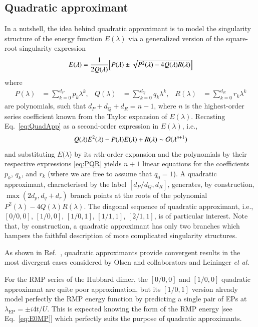 \documentclass[aps,prb,reprint,noshowkeys,linenumbers,superscriptaddress]{revtex4-1}
\newcommand{\latin}[1]{#1}
\newcommand{\ie}{\latin{i.e.}}
\newcommand{\etal}{\textit{et al.}}
\begin{document}
\subsection{Quadratic approximant}
In a nutshell, the idea behind quadratic approximant is to model the singularity structure of the energy function $E(\lambda)$ via a generalized version of the square-root singularity expression \cite{Mayer_1985,Goodson_2011,Goodson_2019}
\begin{equation}
	\label{eq:QuadApp}
	E(\lambda) = \frac{1}{2 Q(\lambda)} \qty[ P(\lambda) \pm \sqrt{P^2(\lambda) - 4 Q(\lambda) R(\lambda)} ]
\end{equation}
where 
\begin{align}
	\label{eq:PQR}
	P(\lambda) & = \sum_{k=0}^{d_P} p_k \lambda^k,
	&
	Q(\lambda) & = \sum_{k=0}^{d_Q} q_k \lambda^k, 
	&
	R(\lambda) & = \sum_{k=0}^{d_R} r_k \lambda^k 
\end{align}
are polynomials, such that $d_P + d_Q + d_R = n - 1$, where $n$ is the highest-order series coefficient known from the Taylor expansion of $E(\lambda)$.
Recasting Eq.~\eqref{eq:QuadApp} as a second-order expression in $E(\lambda)$, \ie,
\begin{equation}
	Q(\lambda) E^2(\lambda) - P(\lambda) E(\lambda) + R(\lambda) \sim \order*{\lambda^{n+1}}
\end{equation}
and substituting $E(\lambda$) by its $n$th-order expansion and the polynomials by their respective expressions \eqref{eq:PQR} yields $n+1$ linear equations for the coefficients $p_k$, $q_k$, and $r_k$ (where we are free to assume that $q_0 = 1$).
A quadratic approximant, characterised by the label $[d_P/d_Q,d_R]$, generates, by construction, $\max(2d_p,d_q+d_r)$ branch points at the roots of the polynomial $P^2(\lambda) - 4 Q(\lambda) R(\lambda)$.
The diagonal sequence of quadratic approximant, \ie, $[0/0,0]$, $[1/0,0]$, $[1/0,1]$, $[1/1,1]$, $[2/1,1]$, is of particular interest.
Note that, by construction, a quadratic approximant has only two branches which hampers the faithful description of more complicated singularity structures.

As shown in Ref.~, quadratic approximants provide convergent results in the most divergent cases considered by Olsen and collaborators \cite{Christiansen_1996,Olsen_1996} and Leininger \etal \cite{Leininger_2000}

For the RMP series of the Hubbard dimer, the $[0/0,0]$ and $[1/0,0]$ quadratic approximant are quite poor approximation, but its $[1/0,1]$ version already model perfectly the RMP energy function by predicting a single pair of EPs at $\lambda_\text{EP} = \pm i 4t/U$.
This is expected knowing the form of the RMP energy [see Eq.~\eqref{eq:E0MP}] which perfectly suits the purpose of quadratic approximants.
\end{document}
